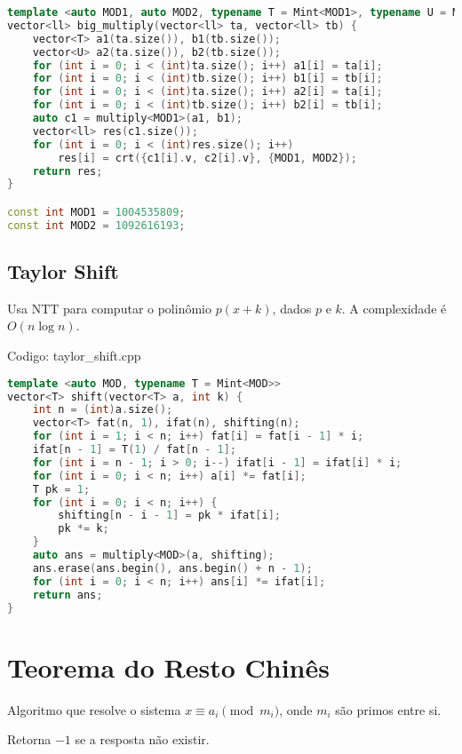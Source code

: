 \documentclass[10pt, a4paper, oneside]{book}
\begin{document}
\begin{lstlisting}[language=C++]
template <auto MOD1, auto MOD2, typename T = Mint<MOD1>, typename U = Mint<MOD2>>
vector<ll> big_multiply(vector<ll> ta, vector<ll> tb) {
    vector<T> a1(ta.size()), b1(tb.size());
    vector<U> a2(ta.size()), b2(tb.size());
    for (int i = 0; i < (int)ta.size(); i++) a1[i] = ta[i];
    for (int i = 0; i < (int)tb.size(); i++) b1[i] = tb[i];
    for (int i = 0; i < (int)ta.size(); i++) a2[i] = ta[i];
    for (int i = 0; i < (int)tb.size(); i++) b2[i] = tb[i];
    auto c1 = multiply<MOD1>(a1, b1);
    vector<ll> res(c1.size());
    for (int i = 0; i < (int)res.size(); i++)
        res[i] = crt({c1[i].v, c2[i].v}, {MOD1, MOD2});
    return res;
}

const int MOD1 = 1004535809;
const int MOD2 = 1092616193;\end{lstlisting}
\hfill

\subsection{Taylor Shift}


Usa NTT para computar o polinômio $p(x + k)$, dados $p$ e $k$. A complexidade é $O(n \log n)$.
\hfill

Codigo: taylor\_shift.cpp

\begin{lstlisting}[language=C++]
template <auto MOD, typename T = Mint<MOD>>
vector<T> shift(vector<T> a, int k) {
    int n = (int)a.size();
    vector<T> fat(n, 1), ifat(n), shifting(n);
    for (int i = 1; i < n; i++) fat[i] = fat[i - 1] * i;
    ifat[n - 1] = T(1) / fat[n - 1];
    for (int i = n - 1; i > 0; i--) ifat[i - 1] = ifat[i] * i;
    for (int i = 0; i < n; i++) a[i] *= fat[i];
    T pk = 1;
    for (int i = 0; i < n; i++) {
        shifting[n - i - 1] = pk * ifat[i];
        pk *= k;
    }
    auto ans = multiply<MOD>(a, shifting);
    ans.erase(ans.begin(), ans.begin() + n - 1);
    for (int i = 0; i < n; i++) ans[i] *= ifat[i];
    return ans;
}\end{lstlisting}
\hfill

\section{Teorema do Resto Chinês}


Algoritmo que resolve o sistema $x \equiv a_i \pmod{m_i}$, onde $m_i$ são primos entre si.



Retorna $-1$ se a resposta não existir.
\end{document}
